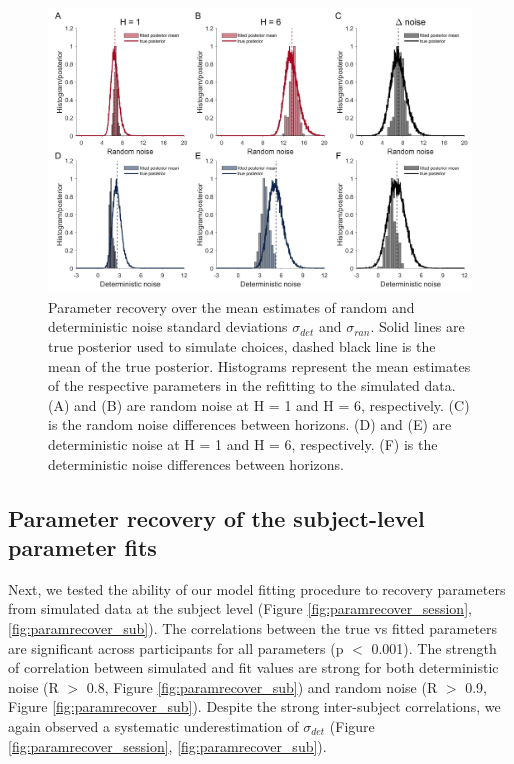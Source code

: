 \documentclass[12pt]{article}
\begin{document}
	\begin{figure}[H]
		\begin{center}
			\includegraphics[width=1\textwidth]{figures/RDBayes_parameterrecovery_hyperprior.jpg}
			\caption{Parameter recovery over the mean estimates of random and deterministic noise standard deviations $\sigma_{det}$ and $\sigma_{ran}$. Solid lines are true posterior used to simulate choices, dashed black line is the mean of the true posterior. Histograms represent the mean estimates of the respective parameters in the refitting to the simulated data. (A) and (B) are random noise at H = 1 and H = 6, respectively. (C) is the random noise differences between horizons. (D) and (E) are deterministic noise at H = 1 and H = 6, respectively. (F) is the deterministic noise differences between horizons.}
			\label{fig:coverage2}
		\end{center}
	\end{figure}

	\newpage
	\subsection{Parameter recovery of the subject-level parameter fits}
	Next, we tested the ability of our model fitting procedure to recovery parameters from simulated data at the subject level (Figure \ref{fig:paramrecover_session}, \ref{fig:paramrecover_sub}). The correlations between the true vs fitted parameters are significant across participants for all parameters (p $<$ 0.001). The strength of correlation between simulated and fit values are strong for both deterministic noise (R $>$ 0.8, Figure \ref{fig:paramrecover_sub}) and random noise (R $>$ 0.9, Figure \ref{fig:paramrecover_sub}). Despite the strong inter-subject correlations, we again observed a systematic underestimation of $\sigma_{det}$ (Figure \ref{fig:paramrecover_session}, \ref{fig:paramrecover_sub}).
	
\end{document}
